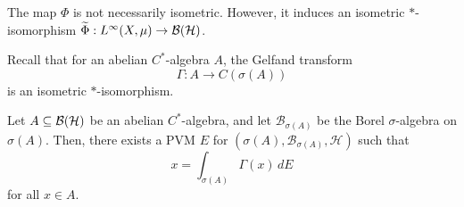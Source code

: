 \begin{remark}
  The map $\Phi$ is not necessarily isometric.
  However, it induces an isometric $*$-isomorphism $\widetilde{\Phi}: L^\infty (X, \mu) \to \operatorname{\mathcal{B} (\mathcal{H})}$.
\end{remark}

Recall that for an abelian $C^*$-algebra $A$, the Gelfand transform 
$$\Gamma: A \to {C} (\sigma(A))$$
is an isometric $*$-isomorphism.

\begin{theorem}\label{thm:6.1}
  Let $A \subseteq \operatorname{\mathcal{B} (\mathcal{H})}$ be an abelian $C^*$-algebra, and let
  $\mathcal{B}_{\sigma(A)}$ be the Borel $\sigma$-algebra on $\sigma(A)$.
  Then, there exists a PVM $E$ for $(\sigma(A), \mathcal{B}_{\sigma(A)}, \mathcal{H})$ such that 
  $$x = \int_{\sigma(A)} \Gamma (x)\, dE$$
  for all $x \in A$.
\end{theorem}


